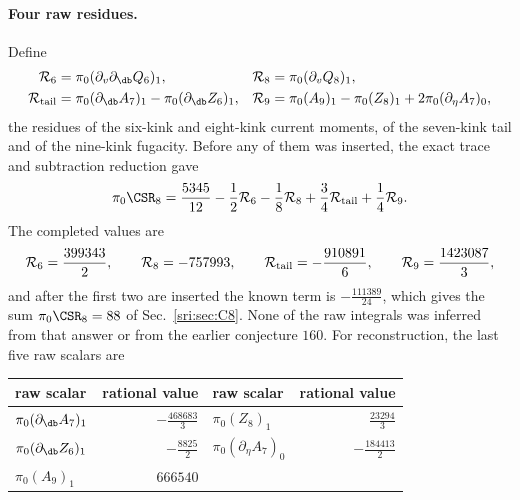 \paragraph{Four raw residues.} Define
\begin{equation}
\begin{aligned}
 \mathcal R_6&=\pi_0(\partial_v\partial_{\db}Q_6)_1, &
 \mathcal R_8&=\pi_0(\partial_vQ_8)_1,\\
 \mathcal R_{\rm tail}&=\pi_0(\partial_{\db}A_7)_1-\pi_0(\partial_{\db}Z_6)_1, &
 \mathcal R_9&=\pi_0(A_9)_1-\pi_0(Z_8)_1+2\pi_0(\partial_\eta A_7)_0,
\end{aligned}
\end{equation}
the residues of the six-kink and eight-kink current moments, of the seven-kink tail and of the nine-kink fugacity.
Before any of them was inserted, the exact trace and subtraction reduction gave
\begin{equation}
 \pi_0\CSR_8=\frac{5345}{12}-\frac12\mathcal R_6-\frac18\mathcal R_8+\frac34\mathcal R_{\rm tail}+\frac14\mathcal R_9 .
\end{equation}
The completed values are
\begin{equation}
 \mathcal R_6=\frac{399343}{2},\qquad \mathcal R_8=-757993,\qquad \mathcal R_{\rm tail}=-\frac{910891}{6},\qquad
 \mathcal R_9=\frac{1423087}{3},
\end{equation}
and after the first two are inserted the known term is $-\frac{111389}{24}$, which gives the sum
$\pi_0\CSR_8=88$ of Sec.~\ref{sri:sec:C8}. None of the raw integrals was inferred from that answer or from the earlier
conjecture $160$. For reconstruction, the last five raw scalars are
\begin{center}\small
\begin{tabular}{@{}lr@{\qquad}lr@{}}
\toprule
raw scalar & rational value & raw scalar & rational value\\
\midrule
$\pi_0(\partial_{\db}A_7)_1$ & $-\frac{468683}{3}$ & $\pi_0(Z_8)_1$ & $\frac{23294}{3}$\\[2pt]
$\pi_0(\partial_{\db}Z_6)_1$ & $-\frac{8825}{2}$ & $\pi_0(\partial_\eta A_7)_0$ & $-\frac{184413}{2}$\\[2pt]
$\pi_0(A_9)_1$ & $666540$ & & \\
\bottomrule
\end{tabular}
\end{center}


